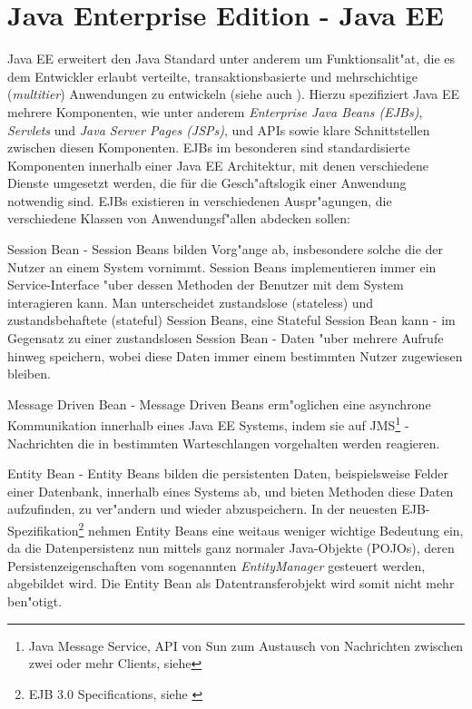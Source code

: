 \section{Java Enterprise Edition - Java EE}
\label{sec:background:jboss}
\label{sec:background:rmi}
Java EE erweitert den Java Standard unter anderem um Funktionsalit"at, die es dem Entwickler erlaubt verteilte, transaktionsbasierte und
mehrschichtige (\emph{multitier}) Anwendungen zu entwickeln (siehe auch \cite{JEEHP}). Hierzu spezifiziert Java EE mehrere Komponenten, wie unter anderem
\emph{Enterprise Java Beans (EJBs)}, \emph{Servlets} und \emph{Java Server Pages (JSPs)}, und APIs sowie klare Schnittstellen zwischen
diesen Komponenten. EJBs im besonderen sind standardisierte Komponenten innerhalb einer Java EE Architektur, mit denen verschiedene
Dienste umgesetzt werden, die für die Gesch"aftslogik einer Anwendung notwendig sind. EJBs existieren in verschiedenen Auspr"agungen, die
verschiedene Klassen von Anwendungsf"allen abdecken sollen:\\
\begin{description}
\item{Session Bean} - Session Beans bilden Vorg"ange ab, insbesondere solche die der Nutzer an einem System vornimmt. Session Beans
    implementieren immer ein Service-Interface "uber dessen Methoden der Benutzer mit dem System interagieren kann. 
    Man unterscheidet zustandslose (stateless) und zustandsbehaftete (stateful) Session Beans, eine Stateful Session Bean kann -
    im Gegensatz zu einer zustandslosen Session Bean - Daten "uber mehrere Aufrufe hinweg speichern, wobei diese Daten immer
    einem bestimmten Nutzer zugewiesen bleiben.
\item{Message Driven Bean} - Message Driven Beans erm"oglichen eine asynchrone Kommunikation innerhalb eines Java EE Systems, indem
    sie auf JMS\footnote{Java Message Service, API von Sun zum Austausch von Nachrichten zwischen zwei oder mehr Clients, siehe\cite{JMSHP}}
    -Nachrichten die in bestimmten Warteschlangen vorgehalten werden reagieren.
\item{Entity Bean} - Entity Beans bilden die persistenten Daten, beispielsweise Felder einer Datenbank, innerhalb eines Systems ab, und
    bieten Methoden diese Daten aufzufinden, zu ver"andern und wieder abzuspeichern. In der neuesten EJB-Spezifikation\footnote{
    EJB 3.0 Specifications, siehe \cite{EJBHP}} nehmen Entity Beans eine weitaus weniger wichtige Bedeutung ein, da die Datenpersistenz nun
    mittels ganz normaler Java-Objekte (POJOs), deren Persistenzeigenschaften vom sogenannten \emph{EntityManager} gesteuert werden, abgebildet wird.
    Die Entity Bean als Datentransferobjekt wird somit nicht mehr ben"otigt.
\end{description}
